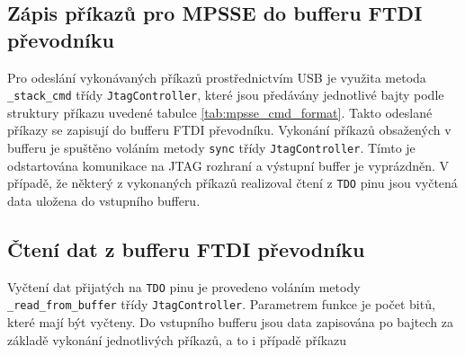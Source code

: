 \subsection{Zápis příkazů pro \acs{MPSSE} do bufferu FTDI převodníku}
Pro odeslání vykonávaných příkazů prostřednictvím USB je využita metoda \texttt{\_stack\_cmd} třídy \texttt{JtagController}, které jsou předávány jednotlivé bajty podle struktury příkazu uvedené tabulce \ref{tab:mpsse_cmd_format}. Takto odeslané příkazy se zapisují do bufferu FTDI převodníku. Vykonání příkazů obsažených v bufferu je spuštěno voláním metody \texttt{sync} třídy \texttt{JtagController}. Tímto je odstartována komunikace na \acs{JTAG} rozhraní a výstupní buffer je vyprázdněn. V případě, že některý z vykonaných příkazů realizoval čtení z \texttt{\acs{TDO}} pinu jsou vyčtená data uložena do vstupního bufferu. \cite{PyFtdi_doc}

\subsection{Čtení dat z bufferu FTDI převodníku}
Vyčtení dat přijatých na \texttt{\acs{TDO}} pinu je provedeno voláním metody \texttt{\_read\_from\_buffer} třídy \texttt{JtagController}. Parametrem funkce je počet bitů, které mají být vyčteny. Do vstupního bufferu jsou data zapisována po bajtech za základě vykonání jednotlivých příkazů, a to i případě příkazu    \cite{PyFtdi_doc}